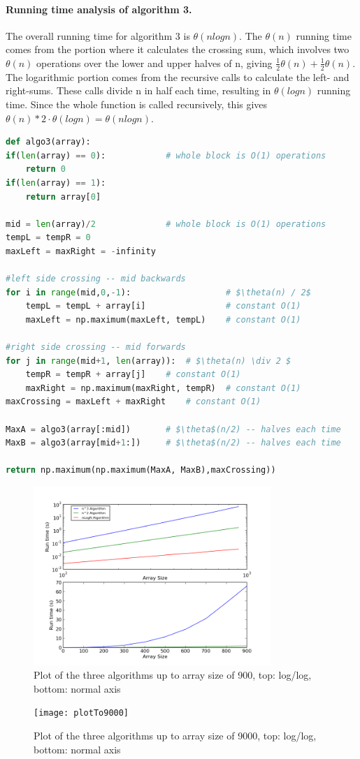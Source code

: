 \documentclass[a4paper,12pt]{article}
\begin{document}
\paragraph{Running time analysis of algorithm 3.} The overall running time for algorithm 3 is $\theta(n log n)$. The $\theta(n)$ running time comes from the portion where it calculates the crossing sum, which involves two $\theta(n)$ operations over the lower and upper halves of n, giving $ \frac{1}{2} \theta(n) + \frac{1}{2} \theta(n)$. The logarithmic portion comes from the recursive calls to calculate the left- and right-sums. These calls divide n in half each time, resulting in $\theta(log n)$ running time. Since the whole function is called recursively, this gives $ \theta(n) * 2 \cdot \theta(log n) = \theta(n log n)$.


  \begin{lstlisting}[language=python,caption={pseudo code for $n\log(n)$ algorithm},mathescape]
def algo3(array):
if(len(array) == 0):			# whole block is O(1) operations
	return 0
if(len(array) == 1):
	return array[0]

mid = len(array)/2				# whole block is O(1) operations
tempL = tempR = 0
maxLeft = maxRight = -infinity

#left side crossing -- mid backwards	
for i in range(mid,0,-1):					# $\theta(n) / 2$ 
	tempL = tempL + array[i]				# constant O(1)
	maxLeft = np.maximum(maxLeft, tempL)	# constant O(1)

#right side crossing -- mid forwards
for j in range(mid+1, len(array)):	# $\theta(n) \div 2 $
	tempR = tempR + array[j]	# constant O(1)
	maxRight = np.maximum(maxRight, tempR)	# constant O(1)
maxCrossing = maxLeft + maxRight	# constant O(1)

MaxA = algo3(array[:mid])		# $\theta$(n/2) -- halves each time
MaxB = algo3(array[mid+1:])		# $\theta$(n/2) -- halves each time

return np.maximum(np.maximum(MaxA, MaxB),maxCrossing))
  \end{lstlisting}  


\begin{figure}[h!]
\centering
\includegraphics[width=0.8\textwidth]{plotTo900}
\caption{Plot of the three algorithms up to array size of 900, top: log/log, bottom: normal axis}
\end{figure} 

\begin{figure}[h!]
\centering
\texttt{[image: plotTo9000]}
\caption{Plot of the three algorithms up to array size of 9000, top: log/log, bottom: normal axis}
\end{figure} 
\end{document}
